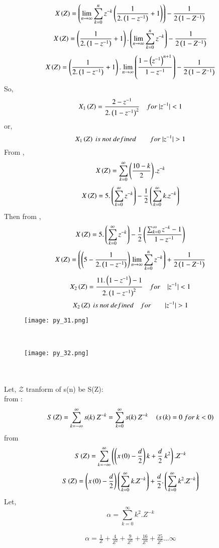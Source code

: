 \documentclass[beamer]{IEEEtran}
\theoremstyle{remark}
\begin{document}
$$X\left(Z\right)=\left(\lim_{n\to\infty}\sum_{k=0}^{n}z^{-k}\left(\frac{1}{2.\left(1-z^{-1}\right)}+1\right)\right)-\frac{1}{2\left(1-Z^{-1}\right)}$$
$$X\left(Z\right)=\left(\frac{1}{2.\left(1-z^{-1}\right)}+1\right).\left(\lim_{n\to\infty}\sum_{k=0}^{n}z^{-k}\right)-\frac{1}{2\left(1-Z^{-1}\right)}$$
$$X\left(Z\right)=\left(\frac{1}{2.\left(1-z^{-1}\right)}+1\right).\lim_{n\to\infty}\left(\frac{1-\left(z^{-1}\right)^{n+1}}{1-z^{-1}}\right)-\frac{1}{2\left(1-Z^{-1}\right)}$$
So,
$$ X_1\left(Z\right)=\frac{2-z^{-1}}{2.\left(1-z^{-1}\right)^2}\quad for\ |z^{-1}|<1$$
or,
$$X_1\brak{Z}\ is\ not\ defined\qquad for\ |z^{-1}|>1 $$
From \brak{\ref{q12}},
$$X\left(Z\right)=\sum_{k=0}^{\infty} \left(\frac{10-k}{2}\right).z^{-k}$$
$$X\left(Z\right)=5.\left(\sum_{k=0}^{\infty}z^{-k}\right)-\frac{1}{2}\left(\sum_{k=0}^{\infty}k.z^{-k}\right)$$
Then from \brak{\ref{q16}},
$$X\left(Z\right)=5.\left(\sum_{k=0}^{\infty}z^{-k}\right)-\frac{1}{2}\left(\frac{\sum_{k=0}^{\infty}z^{-k}-1}{1-z^{-1}}\right)$$
$$X\left(Z\right)=\left(\left(5-\frac{1}{2.\left(1-z^{-1}\right)}\right)\lim_{n\to\infty}\sum_{k=0}^{n}z^{-k}\right)+\frac{1}{2\left(1-Z^{-1}\right)}$$
$$X_2\left(Z\right)=\frac{11.\left(1-z^{-1}\right)-1}{2.\left(1-z^{-1}\right)^2}\quad for\quad |z^{-1}|<1$$
$$X_2\brak{Z}\ is\ not\ defined\quad for\qquad |z^{-1}|>1$$
\begin{figure}[h]
    \centering
    \texttt{[image: py\_31.png]}
    \label{fig:enter-label}
\end{figure}\\
\begin{figure}[h]
    \centering
    \texttt{[image: py\_32.png]}
    \label{fig:enter-label}
\end{figure}\\\\

Let, $\mathcal{Z}$ tranform of s(n) be S(Z):\\
from \brak{\ref{q11}}:
$$S\brak{Z}=\sum_{k=-\infty}^{\infty}s(k)\ Z^{-k}=\sum_{k=0}^{\infty}s(k)\ Z^{-k}\quad \brak{s\brak{k}=0\ for\ k<0}$$
from \brak{\ref{q9}}
$$S\brak{Z}=\sum_{k=-\infty}^{\infty}\left(\brak{x\brak{0}-\frac{d}{2}}k+\frac{d}{2}\ k^2\right).Z^{-k}$$
\begin{align}
\label{q17}
    S\left(Z\right)=\left(x\left(0\right)-\frac{d}{2}\right)\left(\sum_{k=0}^{\infty}k.Z^{-k}\right)+\frac{d}{2}.\left(\sum_{k=0}^{\infty}k^2.Z^{-k}\right)
\end{align}
Let, 
$$
\alpha = \sum_{k=0}^{\infty}k^2.Z^{-k}
$$

\begin{align}
\label{q18}
    \alpha=\frac{1}{Z}+\frac{4}{Z^2}+\frac{9}{Z^3}+\frac{16}{Z^4}+\frac{25}{Z^5}...\infty
\end{align}
\end{document}
